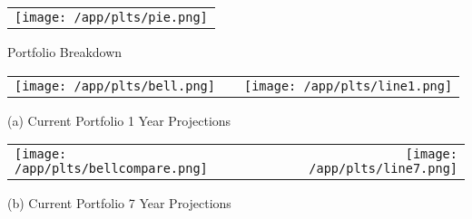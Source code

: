 \documentclass{article}
\begin{document}
\begin{adjustwidth}{-.3in}{0in}%
\vspace*{-1cm}

\begin{center}
  \begin{tabular}{c}
    \texttt{[image: /app/plts/pie.png]}
  \end{tabular}
  \end{center}

  \begin{center}
        Portfolio Breakdown
  \end{center}

\vspace{.7cm}


\begin{center}
  \begin{tabular}{lcr}
  \texttt{[image: /app/plts/bell.png]}
    & \hspace{1cm }&\texttt{[image: /app/plts/line1.png]}
  \end{tabular}
  \end{center}

  \begin{center}
      (a) Current Portfolio 1 Year Projections
  \end{center}

  \vspace{.7cm}


\begin{center}
  \begin{tabular}{lcr}
  \texttt{[image: /app/plts/bellcompare.png]}
    & \hspace{1cm }&\texttt{[image: /app/plts/line7.png]}
  \end{tabular}
  \end{center}

  \begin{center}
      (b) Current Portfolio 7 Year Projections
  \end{center}

 \vspace{.6cm}

\end{adjustwidth}
\end{document}
